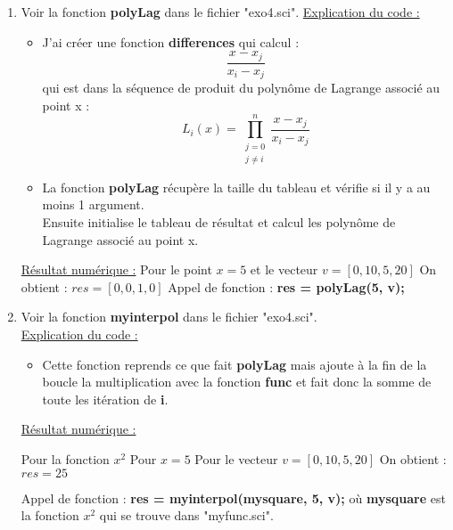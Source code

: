 \documentclass[12pt, letterpaper]{article}
\begin{document}
\begin{enumerate}
\item Voir la fonction \textbf{polyLag} dans le fichier "exo4.sci".\newline
  \underline{Explication du code :}
  \begin{itemize}
  \item J'ai créer une fonction \textbf{differences} qui calcul :
  \begin{equation*}
    \frac{x - x_j}{x_i - x_j}
  \end{equation*}
  qui est dans la séquence de produit du polynôme de Lagrange associé
  au point x :
  \begin{equation*}
    L_i(x) = \prod_{\begin{array}{l} j = 0 \\ j \ne i \end{array}}^{n}\frac{x - x_j}{x_i - x_j}
  \end{equation*}

  \item La fonction \textbf{polyLag} récupère la taille du tableau et
  vérifie si il y a au moins 1 argument.\\
  Ensuite initialise le tableau de résultat et calcul les polynôme de
  Lagrange associé au point x.
  \end{itemize}
  
  \underline{Résultat numérique :}\newline
  Pour le point $x = 5$ et le vecteur $v = [0, 10, 5, 20]$ \newline
  On obtient : $res = [0, 0, 1, 0]$ \newline
  Appel de fonction : \textbf{res = polyLag(5, v);} \newline
  
\item Voir la fonction \textbf{myinterpol} dans le fichier "exo4.sci".\\
  \underline{Explication du code :}
  \begin{itemize}
    \item Cette fonction reprends ce que fait \textbf{polyLag} mais
      ajoute à la fin de la boucle la multiplication avec la fonction
      \textbf{func} et fait donc la somme de toute les itération de
      \textbf{i}.
  \end{itemize}
  
  \underline{Résultat numérique :}

  Pour la fonction $x^2$ \newline
  Pour $x = 5$ \newline
  Pour le vecteur $v = [0, 10, 5, 20]$ \newline
  On obtient : $res = 25$ \newline

  Appel de fonction : \textbf{res = myinterpol(mysquare, 5, v);} \newline
  où \textbf{mysquare} est la fonction $x^2$ qui se trouve dans "myfunc.sci".
  
\end{enumerate}
\end{document}

